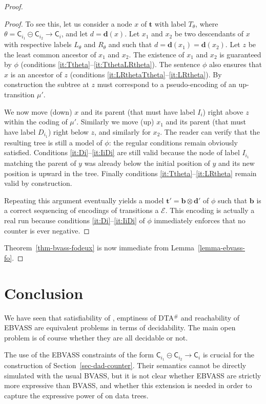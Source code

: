 \documentclass{CSML}
\newcommand\ebvass{\textup{EBVASS}\xspace}
\newcommand\dad{\textup{DTA}$^\#$\xspace}
\newcommand\Ea{\mathcal{E}}
\newcommand\merc[3]{\mathsf{C}_{#1}\mathpunct{\circleddash}\mathsf{C}_{#2}\to\mathsf{C}_{#3}}
\newcommand\tree{\boldsymbol{t}}
\newcommand\btree{\boldsymbol{b}}
\newcommand\dtree{\boldsymbol{d}}
\begin{document}
\begin{proof}
\begin{proof}
To see this, let us consider a node $x$ of $\tree$ 
with label $T_\theta$, 
where $\theta = \merc{i_1}{i_2}{i}$, and let $d = \dtree(x)$. 
Let $x_1$ and $x_2$ be two descendants of $x$ 
with respective labels $L_\theta$ and $R_\theta$
and such that $d = \dtree(x_1) = \dtree(x_2)$. 
Let $z$ be the least common ancestor of $x_1$ and $x_2$.
The existence of $x_1$ and $x_2$ is guaranteed by $\phi$ 
(conditions \ref{it:Ttheta}--\ref{it:TthetaLRtheta}). The sentence $\phi$ also ensures
that $x$ is an ancestor of $z$ 
(conditions \ref{it:LRthetaTtheta}--\ref{it:LRtheta}).  By construction the subtree at $z$ must correspond to
a pseudo-encoding of an up-transition $\mu'$.

We now move (down) $x$ and its parent 
(that must have label $I_i$) 
right above $z$ within the coding of $\mu'$.
Similarly we move (up) $x_1$ and its parent
(that must have label $D_{i_1}$) 
right below $z$, and similarly for $x_2$.  
The reader can verify that the
resulting tree is still a model of $\phi$: the regular conditions remain 
obviously satisfied.  
Conditions \ref{it:Di}--\ref{it:IiDi}  are still valid because the node of label $I_{i_1}$ 
matching the parent of $y$ was already below the initial position of
$y$ and its new position is upward in the tree. 
Finally conditions \ref{it:Ttheta}--\ref{it:LRtheta} remain valid by construction.

Repeating this argument eventually yields a model $\tree'=\btree\otimes\dtree'$
of $\phi$ such that $\btree$ is a correct sequencing of encodings of
transitions a $\Ea$. 
This encoding is actually a real run because 
conditions \ref{it:Di}--\ref{it:IiDi} of $\phi$ immediately enforces that no counter is ever negative.\end{proof}
Theorem~\ref{thm-bvass-fodeux} is now immediate from Lemma~\ref{lemma-ebvass-fo}.
\end{proof}

\section{Conclusion}\label{sec-conclusion}We have seen that satisfiability of \fotwo, emptiness of \dad and reachability
of \ebvass are equivalent problems in terms of decidability. The main open
problem is of course whether they are all decidable or not.


The use of the \ebvass constraints of the form 
$\merc{i_1}{i_2}{i}$
is crucial for the construction of Section~\ref{sec-dad-counter}.
Their semantics cannot be directly simulated with the usual BVASS,
but it is not clear whether \ebvass are strictly more expressive than BVASS,
and whether this extension is needed in order 
to capture the expressive power of \fotwo on data trees. 
\end{document}
